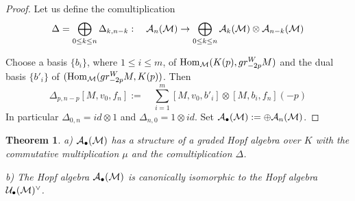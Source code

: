 \documentclass[10pt]{article}
\newtheorem{theorem}{Theorem}[section]
\begin{document}
\begin{proof}
Let us define the comultiplication
$$
\Delta = \bigoplus_{0 \leq k \leq n} \Delta_{k, n-k}: \quad {\cal  A}_{n}({\cal M})
\to \bigoplus_{0 \leq k \leq n } 
{\cal  A}_{k}({\cal M})\otimes
{\cal  A}_{n-k}({\cal M})
$$

 Choose a basis $\{b_i\}$, where $1 \leq i \leq m$,  of ${\rm Hom}_{\cal M} (K(p),gr_{-2p}^W  M)$   and  the dual basis $\{b'_i\}$ of $({\rm Hom}_{\cal M} (gr_{-2p}^W M, K(p) )$.  
Then
$$
\Delta_{p, n-p } [M,v_{0},f_n]:=  \quad \sum_{i=1}^m [M,v_{0},b'_i] \otimes [M, b_i, f_n](-p)
$$
In particular $\Delta_{0,n} = id \otimes 1$ and $\Delta_{n,0} = 1 \otimes id$.  
Set ${\cal A}_{\bullet}({\cal M}):=\oplus {\cal A}_n({\cal M})$.


\end{proof}

\begin{theorem} \label{8-23.3/99}
a) ${\cal  A}_{\bullet}({\cal M})$ has a structure of a 
graded Hopf algebra over $K$ with the commutative multiplication
$\mu$ and the comultiplication $\Delta$.


 b) The Hopf algebra ${\cal  A}_{\bullet}({\cal M})$ is 
canonically isomorphic to the Hopf algebra  ${\cal U}_{\bullet}({\cal M})^{\vee}$.
\end{theorem}
\end{document}
